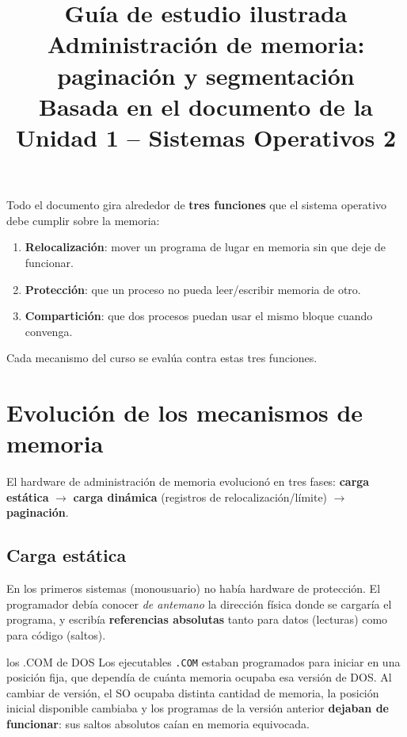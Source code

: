 \documentclass[11pt,letterpaper]{article}
\title{\textbf{Gu\'ia de estudio ilustrada}\\[4pt]\Large Administraci\'on de memoria: paginaci\'on y segmentaci\'on\\[4pt]\normalsize Basada en el documento de la Unidad 1 -- Sistemas Operativos 2}
\author{}
\date{}
\begin{document}
\maketitle
\thispagestyle{empty}

\begin{idea}
Todo el documento gira alrededor de \textbf{tres funciones} que el sistema operativo debe cumplir sobre la memoria:
\begin{enumerate}[nosep]
  \item \textbf{Relocalizaci\'on}: mover un programa de lugar en memoria sin que deje de funcionar.
  \item \textbf{Protecci\'on}: que un proceso no pueda leer/escribir memoria de otro.
  \item \textbf{Compartici\'on}: que dos procesos puedan usar el mismo bloque cuando convenga.
\end{enumerate}
Cada mecanismo del curso se eval\'ua contra estas tres funciones.
\end{idea}

\tableofcontents
\newpage

\section{Evoluci\'on de los mecanismos de memoria}

El hardware de administraci\'on de memoria evolucion\'o en tres fases: \textbf{carga est\'atica} $\rightarrow$ \textbf{carga din\'amica} (registros de relocalizaci\'on/l\'imite) $\rightarrow$ \textbf{paginaci\'on}.

\subsection{Carga est\'atica}

En los primeros sistemas (monousuario) no hab\'ia hardware de protecci\'on. El programador deb\'ia conocer \emph{de antemano} la direcci\'on f\'isica donde se cargar\'ia el programa, y escrib\'ia \textbf{referencias absolutas} tanto para datos (lecturas) como para c\'odigo (saltos).

\begin{ejemplo}{los .COM de DOS}
Los ejecutables \texttt{.COM} estaban programados para iniciar en una posici\'on fija, que depend\'ia de cu\'anta memoria ocupaba esa versi\'on de DOS. Al cambiar de versi\'on, el SO ocupaba distinta cantidad de memoria, la posici\'on inicial disponible cambiaba y los programas de la versi\'on anterior \textbf{dejaban de funcionar}: sus saltos absolutos ca\'ian en memoria equivocada.
\end{ejemplo}
\end{document}
